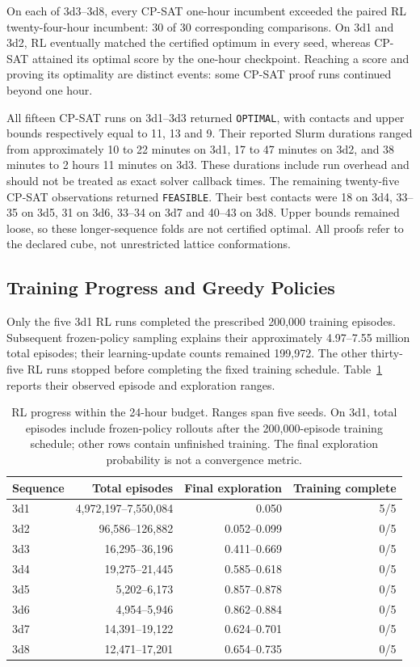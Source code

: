 \documentclass{article}
\theoremstyle{plain}
\theoremstyle{definition}
\begin{document}
On each of 3d3--3d8, every CP-SAT one-hour incumbent exceeded the paired RL twenty-four-hour incumbent: 30 of 30 corresponding comparisons. On 3d1 and 3d2, RL eventually matched the certified optimum in every seed, whereas CP-SAT attained its optimal score by the one-hour checkpoint. Reaching a score and proving its optimality are distinct events: some CP-SAT proof runs continued beyond one hour.

All fifteen CP-SAT runs on 3d1--3d3 returned \texttt{OPTIMAL}, with contacts and upper bounds respectively equal to 11, 13 and 9. Their reported Slurm durations ranged from approximately 10 to 22 minutes on 3d1, 17 to 47 minutes on 3d2, and 38 minutes to 2 hours 11 minutes on 3d3. These durations include run overhead and should not be treated as exact solver callback times. The remaining twenty-five CP-SAT observations returned \texttt{FEASIBLE}. Their best contacts were 18 on 3d4, 33--35 on 3d5, 31 on 3d6, 33--34 on 3d7 and 40--43 on 3d8. Upper bounds remained loose, so these longer-sequence folds are not certified optimal. All proofs refer to the declared cube, not unrestricted lattice conformations.

\subsection{Training Progress and Greedy Policies}
Only the five 3d1 RL runs completed the prescribed 200,000 training episodes. Subsequent frozen-policy sampling explains their approximately 4.97--7.55 million total episodes; their learning-update counts remained 199,972. The other thirty-five RL runs stopped before completing the fixed training schedule. Table~\ref{tab:training_progress} reports their observed episode and exploration ranges.

\begin{table}[htbp]
\centering
\caption{RL progress within the 24-hour budget. Ranges span five seeds. On 3d1, total episodes include frozen-policy rollouts after the 200,000-episode training schedule; other rows contain unfinished training. The final exploration probability is not a convergence metric.}\label{tab:training_progress}
\begin{tabular}{lrrr}
\toprule
Sequence & Total episodes & Final exploration & Training complete \\
\midrule
3d1 & 4,972,197--7,550,084 & 0.050 & 5/5 \\
3d2 & 96,586--126,882 & 0.052--0.099 & 0/5 \\
3d3 & 16,295--36,196 & 0.411--0.669 & 0/5 \\
3d4 & 19,275--21,445 & 0.585--0.618 & 0/5 \\
3d5 & 5,202--6,173 & 0.857--0.878 & 0/5 \\
3d6 & 4,954--5,946 & 0.862--0.884 & 0/5 \\
3d7 & 14,391--19,122 & 0.624--0.701 & 0/5 \\
3d8 & 12,471--17,201 & 0.654--0.735 & 0/5 \\
\bottomrule
\end{tabular}
\end{table}
\end{document}
